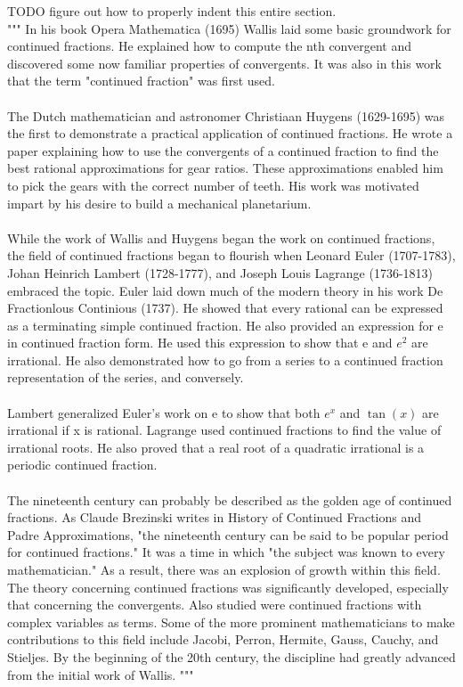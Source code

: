 \documentclass[a4paper]{article}
\begin{document}
    TODO figure out how to properly indent this entire section.
    \\
    """
    In his book Opera Mathematica (1695) Wallis laid some basic groundwork for continued fractions.
    He explained how to compute the nth convergent and discovered some now familiar properties of convergents.
    It was also in this work that the term "continued fraction" was first used.
    \\
    \\
    The Dutch mathematician and astronomer Christiaan Huygens (1629-1695) was the first to demonstrate a practical application of continued fractions.
    He wrote a paper explaining how to use the convergents of a continued fraction to find the best rational approximations for gear ratios.
    These approximations enabled him to pick the gears with the correct number of teeth.
    His work was motivated impart by his desire to build a mechanical planetarium.
    \\
    \\
    While the work of Wallis and Huygens began the work on continued fractions, the field of continued fractions began to flourish when Leonard Euler (1707-1783), Johan Heinrich Lambert (1728-1777), and Joseph Louis Lagrange (1736-1813) embraced the topic.
    Euler laid down much of the modern theory in his work De Fractionlous Continious (1737).
    He showed that every rational can be expressed as a terminating simple continued fraction.
    He also provided an expression for e in continued fraction form.
    He used this expression to show that e and $e^2$ are irrational.
    He also demonstrated how to go from a series to a continued fraction representation of the series, and conversely.
    \\
    \\
    Lambert generalized Euler's work on e to show that both $e^x$ and $\tan(x)$ are irrational if x is rational.
    Lagrange used continued fractions to find the value of irrational roots.
    He also proved that a real root of a quadratic irrational is a periodic continued fraction.
    \\
    \\
    The nineteenth century can probably be described as the golden age of continued fractions.
    As Claude Brezinski writes in History of Continued Fractions and Padre Approximations, "the nineteenth century can be said to be popular period for continued fractions."
    It was a time in which "the subject was known to every mathematician."
    As a result, there was an explosion of growth within this field.
    The theory concerning continued fractions was significantly developed, especially that concerning the convergents.
    Also studied were continued fractions with complex variables as terms.
    Some of the more prominent mathematicians to make contributions to this field include Jacobi, Perron, Hermite, Gauss, Cauchy, and Stieljes.
    By the beginning of the 20th century, the discipline had greatly advanced from the initial work of Wallis.
    """
\end{document}
